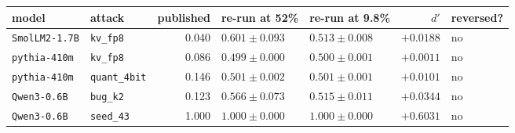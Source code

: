 \begin{tabular}{llrllr l}
\toprule
model & attack & published & re-run at 52\% &
re-run at 9.8\% & $d'$ & reversed? \\
\midrule
\texttt{SmolLM2-1.7B} & \texttt{kv\_fp8} & 0.040 & $0.601 \pm 0.093$ & $0.513 \pm 0.008$ & $+0.0188$ & no \\
\texttt{pythia-410m} & \texttt{kv\_fp8} & 0.086 & $0.499 \pm 0.000$ & $0.500 \pm 0.001$ & $+0.0011$ & no \\
\texttt{pythia-410m} & \texttt{quant\_4bit} & 0.146 & $0.501 \pm 0.002$ & $0.501 \pm 0.001$ & $+0.0101$ & no \\
\texttt{Qwen3-0.6B} & \texttt{bug\_k2} & 0.123 & $0.566 \pm 0.073$ & $0.515 \pm 0.011$ & $+0.0344$ & no \\
\texttt{Qwen3-0.6B} & \texttt{seed\_43} & 1.000 & $1.000 \pm 0.000$ & $1.000 \pm 0.000$ & $+0.6031$ & no \\
\bottomrule
\end{tabular}

